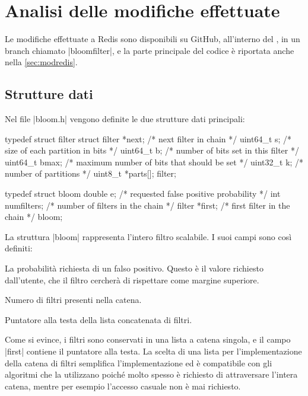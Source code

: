 \section{Analisi delle modifiche effettuate}
\label{sec:patchexplain}

Le modifiche effettuate a Redis sono disponibili su GitHub, all'interno del
, in un branch
chiamato \cverb|bloomfilter|, e la parte principale del codice è riportata anche
nella \autoref{sec:modredis}.

\subsection{Strutture dati}

Nel file \cverb|bloom.h| vengono definite le due strutture dati principali:

\begin{commentedsource}[style=csource,caption=Strutture dati,label={lst:bloomStruct}]
typedef struct filter {
    struct filter *next;  /* next filter in chain */
    uint64_t s;           /* size of each partition in bits */
    uint64_t b;           /* number of bits set in this filter */
    uint64_t bmax;        /* maximum number of bits that should be set */
    uint32_t k;           /* number of partitions */
    uint8_t *parts[];
} filter;

typedef struct bloom {
	double e;             /* requested false positive probability */
	int numfilters;       /* number of filters in the chain */
	filter *first;        /* first filter in the chain */
} bloom;
\end{commentedsource}

La struttura \cverb|bloom| rappresenta l'intero filtro scalabile. I suoi campi sono
così definiti:

\begin{description}[leftmargin=!,labelwidth=8em,font={\bfseries\ttfamily}]
  \item[double e] La probabilità richiesta di un falso positivo. Questo è il valore richiesto
      dall'utente, che il filtro cercherà di rispettare come margine superiore.
  \item[int numfilters] Numero di filtri presenti nella catena.
  \item[filter *first] Puntatore alla testa della lista concatenata di filtri.
\end{description}

Come si evince, i filtri sono conservati in una lista a catena singola, e il campo \cverb|first|
contiene il puntatore alla testa. La scelta di una lista per l'implementazione della catena di
filtri semplifica l'implementazione ed è compatibile con gli algoritmi che la utilizzano poiché
molto spesso è richiesto di attraversare l'intera catena, mentre per esempio l'accesso casuale non è
mai richiesto.

